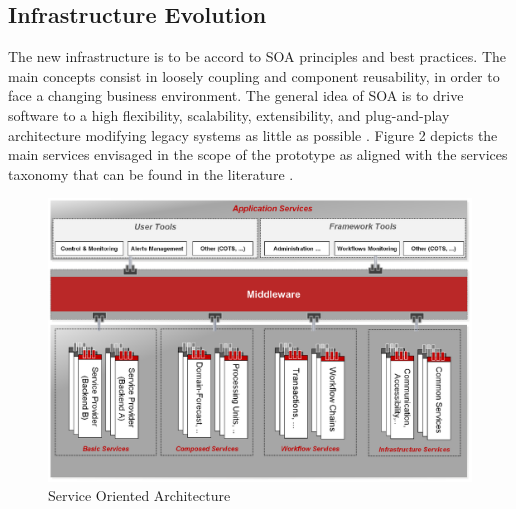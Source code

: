 \subsection{Infrastructure Evolution}
The new infrastructure is to be accord to SOA principles and best practices. The main concepts consist in loosely coupling and component reusability, in order to face a changing business environment. The general idea of SOA is to drive software to a high flexibility, scalability, extensibility, and plug-and-play architecture modifying legacy systems as little as possible \citep{soa1}. Figure 2 depicts the main services envisaged in the scope of the prototype as aligned with the services taxonomy that can be found in the literature \citep{soa2}.
\begin{figure}[h]
\centering
\includegraphics[width=80 mm]{part10/Perez_P022/P022_f2.eps}
\caption{Service Oriented Architecture}
\end{figure}
